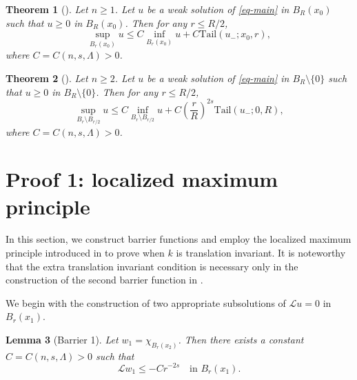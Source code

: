 \documentclass[11pt]{amsart}
\theoremstyle{plain}
\newtheorem{theorem}{Theorem}[section]
\newtheorem{lemma}[theorem]{Lemma}
\theoremstyle{definition}
\numberwithin{equation}{section}
\begin{document}
\begin{theorem}[{\cite[Theorem~1.1]{DCKP14}}]\label{thm-Harnack}
Let $n \geq 1$. Let $u$ be a weak solution of \eqref{eq-main} in $B_R(x_0)$ such that $u \geq 0$ in $B_R(x_0)$. Then for any $r \leq R/2$,
	\begin{equation*}
		\sup_{B_r(x_0)}u \leq C \inf_{B_r(x_0)}u + C\mathrm{Tail}(u_-; x_0, r),
	\end{equation*}
where $C=C(n, s, \Lambda)>0$.
\end{theorem}

\begin{theorem}[{\cite[Theorem~3.9]{KL24}}]\label{thm-Harnack-annulus}
Let $n \geq 2$. Let $u$ be a weak solution of \eqref{eq-main} in $B_R \setminus \{0\}$ such that $u \geq 0$ in $B_R \setminus \{0\}$. Then for any $r \leq R/2$, 
\begin{equation*}
\sup_{B_r \setminus B_{r/2}}{u} \leq C \inf_{B_r \setminus B_{r/2}}{u} + C \left(\frac{r}{R}\right)^{2s}\mathrm{Tail}(u_-; 0, R),
\end{equation*}
where $C=C(n, s, \Lambda)>0$.
\end{theorem}


\section{Proof 1: localized maximum principle}\label{sec-harnack-barrier}
In this section, we construct barrier functions and employ the localized maximum principle introduced in \cite{KL25} to prove  when $k$ is translation invariant. It is noteworthy that the extra translation invariant condition is necessary only in the construction of the second barrier function in . 

We begin with the construction of two appropriate subsolutions of $\mathcal{L}u=0$ in $B_r(x_1)$. 

\begin{lemma}[Barrier 1]\label{lem-barrier1}
    Let $w_1=\chi_{B_r(x_2)}$. Then there exists a constant $C=C(n, s, \Lambda)>0$ such that
    \begin{equation*}
        \mathcal{L}w_1 \leq -Cr^{-2s} \quad \text{in $B_{r}(x_1)$}.
    \end{equation*}
\end{lemma}
\end{document}
